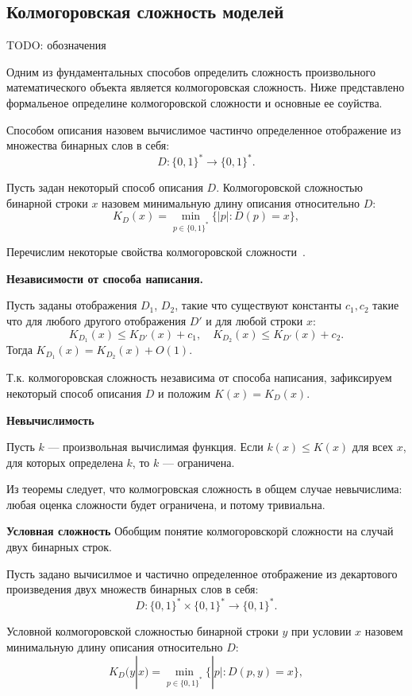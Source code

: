 \documentclass[../main.tex]{subfiles}
\begin{document}
\subsection{Колмогоровская сложность моделей}
TODO: обозначения

Одним из фундаментальных способов определить сложность произвольного математического объекта является колмогоровская сложность. Ниже представлено формальеное определине колмогоровской сложности и основные ее соуйства.

\begin{definition}
Способом описания назовем вычислимое частинчо определенное отображение из множества бинарных слов в себя:
\[
D: \{0,1\}^{*}  \to  \{0,1\}^{*}.
\]
\end{definition}
\begin{definition}
Пусть задан некоторый способ описания $D$. 
Колмогоровской сложностью бинарной строки $x$ назовем минимальную длину описания относительно $D$:
\[
K_D(x) = \min_{p \in \{0,1\}^*}\{|p|: D(p) = x\},
\]
\end{definition}


Перечислим некоторые свойства колмогоровской сложности~\cite{kolmogorov}.

\textbf{Независимости от способа написания.}
\begin{theorembd}
Пусть заданы  отображения $D_1$, $D_2$, такие что существуют константы $c_1, c_2$ такие что для любого другого отображения $D'$ и для любой строки $x$:
\[
	K_{D_1}(x) \leq K_{D'}(x) + c_1, \quad K_{D_2}(x) \leq K_{D'}(x) + c_2.
\]
Тогда $K_{D_1}(x) = K_{D_2}(x) + O(1).$
\end{theorembd}

Т.к. колмогоровская сложность независима от способа написания, зафиксируем некоторый способ описания $D$ и положим $K(x) = K_D(x).$

\textbf{Невычислимость }
\begin{theorembd}
Пусть $k$ --- произвольная вычислимая функция. Если $k(x) \leq K(x) $ для всех $x$, для которых определена $k$, то $k$ --- ограничена.
\end{theorembd}

Из теоремы следует, что колмогровская сложность в общем случае невычислима: любая оценка сложности будет ограничена, и потому тривиальна.

\textbf{Условная сложность}
Обобщим понятие колмогоровскорй сложности на случай двух бинарных строк.

\begin{definition}
Пусть задано вычисилмое и частично определенное отображение из декартового произведения двух множеств бинарных слов в себя:
\[
D: \{0,1\}^{*} \times  \{0,1\}^{*} \to  \{0,1\}^{*}.
\]

Условной колмогоровской сложностью бинарной строки $y$ при условии $x$ назовем минимальную длину описания относительно $D$:
\[
K_D(y|x) = \min_{p \in \{0,1\}^*}\{|p|: D(p, y) = x\},
\]
\end{definition}
\end{document}
